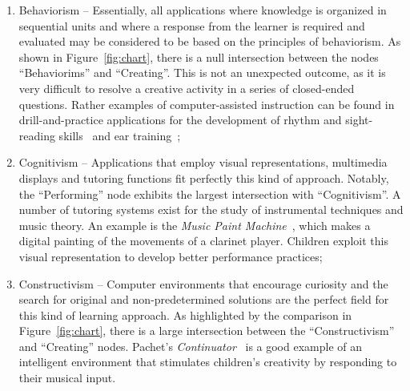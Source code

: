 \documentclass[journal]{IEEEtran}
\newcommand{\node}[1]{{\fontfamily{cmss}\selectfont #1}}
\begin{document}
\begin{enumerate}[label=3.\arabic*.,leftmargin=0.7cm,listparindent=-\leftmargin, start=0]
\begin{enumerate}[label=3.0.\arabic*.,leftmargin=0.9cm,listparindent=-\leftmargin, start=0] 
\item \node{Behaviorism} --  Essentially, all applications where knowledge is organized in sequential units and where a response from the learner is required and evaluated may be considered to be based on the principles of behaviorism. As shown in Figure~\ref{fig:chart}, there is a null intersection between the nodes ``Behaviorims'' and ``Creating''. This is not an unexpected outcome, as it is very difficult to resolve a creative activity in a series of closed-ended questions. Rather examples of computer-assisted instruction can be found in drill-and-practice applications for the development of rhythm and sight-reading skills~\cite{smith} and ear training~\cite{loh};
%
\item \node{Cognitivism} -- Applications that employ visual representations, multimedia displays and tutoring functions fit perfectly this kind of approach. Notably, the ``Performing'' node exhibits the largest intersection with ``Cognitivism''. A number of tutoring systems exist for the study of instrumental techniques and music theory. An example is the \textit{Music Paint Machine}~\cite{nijs2012music}, which makes a digital painting of the movements of a clarinet player. Children exploit this visual representation to develop better performance practices;
%
\item \node{Constructivism} --  Computer environments that encourage curiosity and the search for original and non-predetermined solutions are the perfect field for this kind of learning approach. As highlighted by the comparison in Figure~\ref{fig:chart}, there is a large intersection between the ``Constructivism'' and ``Creating'' nodes. Pachet's \textit{Continuator}~\cite{addessi} is a good example of an intelligent environment that stimulates children's creativity by responding to their musical input.

\end{enumerate}


\end{enumerate}
\end{document}
